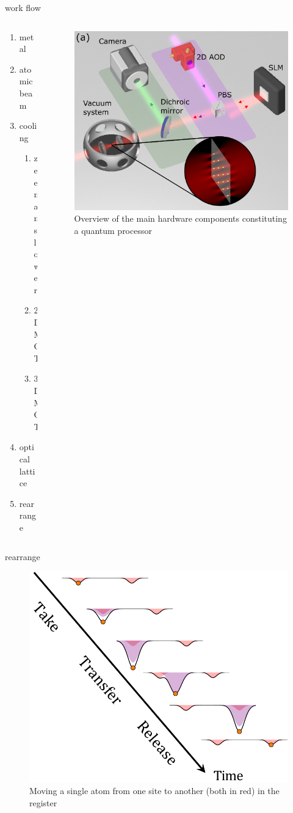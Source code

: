 \documentclass[18 pt]{beamer}
\begin{document}
\begin{frame}{work flow}
\begin{columns}
  \begin{column}{.3\textwidth}
    \begin{enumerate}[itemsep = 10pt]
      \item metal
      \item atomic beam
      \item cooling
      \begin{enumerate}[itemsep = 5pt]
        \item zeeman slower
        \item 2D MOT
        \item 3D MOT
      \end{enumerate}
      \item optical lattice
      \item rearrange
    \end{enumerate}
  \end{column}
  \begin{column}{.7\textwidth}
    \begin{figure}
      \includegraphics[width=.9\textwidth]{IMG/image.png}
      \caption{Overview of the main hardware components constituting a quantum processor}
    \end{figure}
  \end{column}
\end{columns}
\end{frame}
\begin{frame}{rearrange}
  \begin{figure}
    \includegraphics[width=.5\textwidth]{IMG/rearrange.png}
    \caption{Moving a single atom from one site to another (both in red) in the register}
  \end{figure}
\end{frame}
\end{document}
